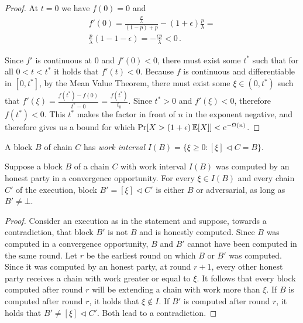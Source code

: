 \begin{proof}
  At $t = 0$ we have $f(0) = 0$ and
  \begin{align*}
    f'(0) = \frac{\frac{p}{\lambda}}{(1 - p) + p} - (1 + \epsilon)\frac{p}{\lambda} =\\
    \frac{p}{\lambda}(1 - 1 - \epsilon) = -\frac{\epsilon p}{\lambda} < 0\,.
  \end{align*}

  Since $f'$ is continuous at $0$ and $f'(0) < 0$, there must exist some $t^*$ such that for all
  $0 < t < t^*$ it holds that $f'(t) < 0$. Because $f$ is continuous and differentiable in $[0, t^*]$,
  by the Mean Value Theorem, there must exist some $\xi \in (0, t^*)$ such that
  $f'(\xi) = \frac{f(t^*) - f(0)}{t^* - 0} = \frac{f(t^*)}{t_0}$.
  Since $t^* > 0$ and $f'(\xi) < 0$, therefore $f(t^*) < 0$.
  This $t^*$ makes the factor in front of $n$ in the exponent negative, and therefore
  gives us a bound for which $\Pr[X > (1 + \epsilon)\mathop{{}\mathbb{E}}[X]] < e^{-\Omega(n)}$.
\end{proof}

\begin{definition}
  A block $B$ of chain $C$ has \emph{work interval}
  $I(B) = \{\xi \geq 0: [\xi] \lhd C = B\}$.
\end{definition}


\begin{lemma} \label{lem:pairing}
  Suppose a block $B$ of a chain $C$ with work interval $I(B)$
  was computed by an honest party in a convergence opportunity.
  For every $\xi \in I(B)$ and every chain $C'$ of the execution,
  block $B' = [\xi] \lhd C'$ is either $B$ or adversarial,
  as long as $B' \neq \bot$.
\end{lemma}
\begin{proof}
  Consider an execution as in the statement and suppose, towards a contradiction,
  that block $B'$ is not $B$ and is honestly computed.
  Since $B$ was computed in a convergence opportunity, $B$ and $B'$
  cannot have been computed in the same round. Let $r$ be the earliest round
  on which $B$ or $B'$ was computed. Since it was computed by
  an honest party, at round $r + 1$, every other honest party receives
  a chain with work greater or equal to $\xi$.
  It follows that every block computed
  after round $r$ will be extending a chain with work more than $\xi$.
  If $B$ is computed after round $r$, it holds that $\xi \not \in I$.
  If $B'$ is computed after round $r$, it holds that $B' \neq [\xi] \lhd C'$.
  Both lead to a contradiction. \Qed
\end{proof}

